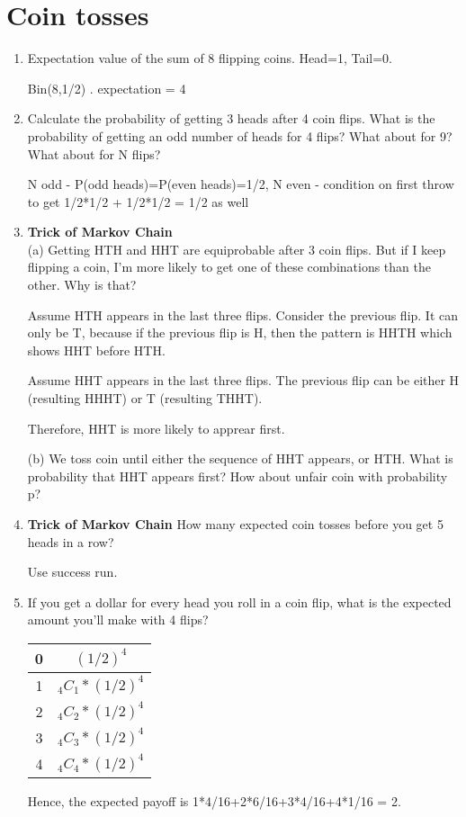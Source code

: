 \documentclass{article}
\begin{document}
\section{Coin tosses}
\begin{enumerate}
     \item Expectation value of the sum of 8 flipping coins. Head=1, Tail=0. 

     Bin(8,1/2) . expectation = 4 \\
    \item Calculate the probability of getting 3 heads after 4 coin flips. What is the probability of getting an odd number of heads for 4 flips? What about for 9? What about for N flips?


    N odd - P(odd heads)=P(even heads)=1/2, N even - condition on first throw to get 1/2*1/2 + 1/2*1/2 = 1/2 as well

    
    \item \textbf{Trick of Markov Chain}\\
    (a) Getting HTH and HHT are equiprobable after 3 coin flips. But if I keep flipping a coin, I'm more likely to get one of these combinations than the other. Why is that?

    Assume HTH appears in the last three flips. Consider the previous flip. It can only be T, because if the previous flip is H, then the pattern is HHTH which shows HHT before HTH. 

    Assume HHT appears in the last three flips. The previous flip can be either H (resulting HHHT) or T (resulting THHT). 

    Therefore, HHT is more likely to apprear first. 

    (b) We toss coin until either the sequence of HHT appears, or HTH. What is probability that HHT appears first? How about unfair coin with probability p?

    \item \textbf{Trick of Markov Chain} How many expected coin tosses before you get 5 heads in a row?

    Use success run.

    \item If you get a dollar for every head you roll in a coin flip, what is the expected amount you'll make with 4 flips?

    \begin{table}[h]
        \centering
        \begin{tabular}{c|c}
            \hline
            0 & $(1/2)^4$ \\
            \hline
            1 & $_4C_1*(1/2)^4$  \\
            \hline
            2 & $_4C_2*(1/2)^4$ \\
            \hline
            3 & $_4C_3*(1/2)^4$ \\
            \hline
            4 & $_4C_4*(1/2)^4$ \\
            \hline 
        \end{tabular}
        \label{tab:my_label}
    \end{table}
    Hence, the expected payoff is 1*4/16+2*6/16+3*4/16+4*1/16 = 2.


\end{enumerate}
\end{document}

